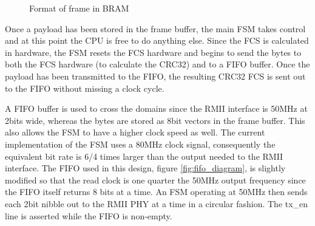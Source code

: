 \begin{figure}[h!]
    \centering
    \caption{Format of frame in BRAM}
    \label{fig:bram_frame_format}
\end{figure}


\noindent Once a payload has been stored in the frame buffer, the main FSM takes control and at this point the CPU is free to do anything else. Since the FCS is calculated in hardware, the FSM resets the FCS hardware and begins to send the bytes to both the FCS hardware (to calculate the CRC32) and to a FIFO buffer. Once the payload has been transmitted to the FIFO, the resulting CRC32 FCS is sent out to the FIFO without missing a clock cycle. 

A FIFO buffer is used to cross the domains since the RMII interface is 50MHz at 2bits wide, whereas the bytes are stored as 8bit vectors in the frame buffer. This also allows the FSM to have a higher clock speed as well. The current implementation of the FSM uses a 80MHz clock signal, consequently the equivalent bit rate is 6/4 times larger than the output needed to the RMII interface. The FIFO used in this design, figure \ref{fig:fifo_diagram}, is slightly modified so that the read clock is one quarter the 50MHz output frequency since the FIFO itself returns 8 bits at a time. An FSM operating at 50MHz then sends each 2bit nibble out to the RMII PHY at a time in a circular fashion. The tx\_en line is asserted while the FIFO is non-empty.


